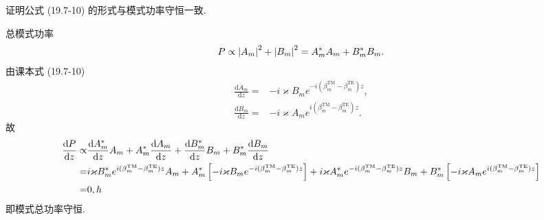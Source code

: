\documentclass{note}
\begin{document}
\begin{exe}
    证明公式 (19.7-10) 的形式与模式功率守恒一致.
\end{exe}
\begin{pf}
    总模式功率
    \begin{align}
        P\propto\left\lvert A_m\right\rvert^2+\left\lvert B_m\right\rvert^2=A_m^*A_m+B_m^*B_m.
    \end{align}
    由课本式 (19.7-10)
    \begin{align}
        \frac{\mathrm{d}A_m}{\mathrm{d}z}=&-i\varkappa B_me^{-i(\beta_m^{\text{TM}}-\beta_m^{\text{TE}})z},\\
        \frac{\mathrm{d}B_m}{\mathrm{d}z}=&-i\varkappa A_me^{i(\beta_m^{\text{TM}}-\beta_m^{\text{TE}})z}.
    \end{align}
    故
    \begin{align}
        \notag\frac{\mathrm{d}P}{\mathrm{d}z}\propto&\frac{\mathrm{d}A_m^*}{\mathrm{d}z}A_m+A_m^*\frac{\mathrm{d}A_m}{\mathrm{d}z}+\frac{\mathrm{d}B_m^*}{\mathrm{d}z}B_m+B_m^*\frac{\mathrm{d}B_m}{\mathrm{d}z}\\
        \notag=&i\varkappa B_m^*e^{i(\beta_m^{\text{TM}}-\beta_m^{\text{TE}})z}A_m+A_m^*\left[-i\varkappa B_me^{-i(\beta_m^{\text{TM}}-\beta_m^{\text{TE}})z}\right]+i\varkappa A_m^*e^{-i(\beta_m^{\text{TM}}-\beta_m^{\text{TE}})z}B_m+B_m^*\left[-i\varkappa A_me^{i(\beta_m^{\text{TM}}-\beta_m^{\text{TE}})z}\right]\\
        =&0,h
    \end{align}
    即模式总功率守恒.
\end{pf}
\end{document}
